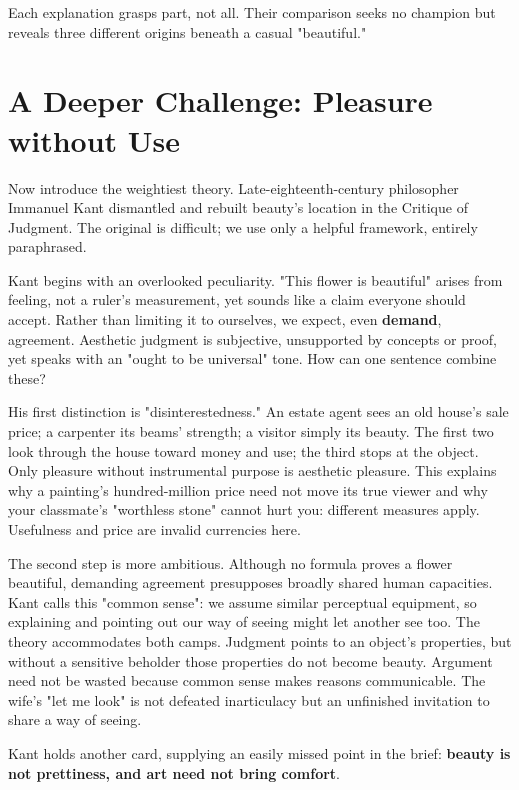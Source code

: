 Each explanation grasps part, not all. Their comparison seeks no champion but reveals three different origins beneath a casual "beautiful."

\section{A Deeper Challenge: Pleasure without Use}
Now introduce the weightiest theory. Late-eighteenth-century philosopher Immanuel Kant dismantled and rebuilt beauty's location in the Critique of Judgment. The original is difficult; we use only a helpful framework, entirely paraphrased.

Kant begins with an overlooked peculiarity. "This flower is beautiful" arises from feeling, not a ruler's measurement, yet sounds like a claim everyone should accept. Rather than limiting it to ourselves, we expect, even \textbf{demand}, agreement. Aesthetic judgment is subjective, unsupported by concepts or proof, yet speaks with an "ought to be universal" tone. How can one sentence combine these?

His first distinction is "disinterestedness." An estate agent sees an old house's sale price; a carpenter its beams' strength; a visitor simply its beauty. The first two look through the house toward money and use; the third stops at the object. Only pleasure without instrumental purpose is aesthetic pleasure. This explains why a painting's hundred-million price need not move its true viewer and why your classmate's "worthless stone" cannot hurt you: different measures apply. Usefulness and price are invalid currencies here.

The second step is more ambitious. Although no formula proves a flower beautiful, demanding agreement presupposes broadly shared human capacities. Kant calls this "common sense": we assume similar perceptual equipment, so explaining and pointing out our way of seeing might let another see too. The theory accommodates both camps. Judgment points to an object's properties, but without a sensitive beholder those properties do not become beauty. Argument need not be wasted because common sense makes reasons communicable. The wife's "let me look" is not defeated inarticulacy but an unfinished invitation to share a way of seeing.

Kant holds another card, supplying an easily missed point in the brief: \textbf{beauty is not prettiness, and art need not bring comfort}.

